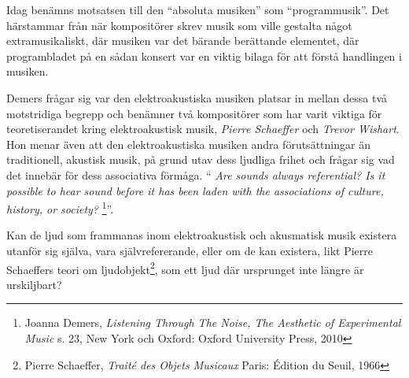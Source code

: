 \documentclass{article}
\begin{document}
Idag benämns motsatsen till den ``absoluta musiken'' som ``programmusik''. Det härstammar från när
kompositörer skrev musik som ville gestalta något extramusikaliskt, där musiken var det bärande berättande
elementet, där programbladet på en sådan konsert var en viktig bilaga
för att förstå handlingen i musiken. 

Demers frågar sig var den elektroakustiska musiken platsar in mellan dessa två motstridiga begrepp och
benämner två kompositörer som har varit viktiga för teoretiserandet kring elektroakustisk musik, \emph{Pierre
Schaeffer} och \emph{Trevor Wishart}. Hon menar även att den elektroakustiska musiken andra förutsättningar än
traditionell, akustisk musik, på grund utav dess ljudliga frihet och frågar sig
vad det innebär för dess associativa förmåga. ``
\emph{Are sounds always referential? Is it possible to hear sound before it has been laden with the
associations of culture, history, or society?}
\footnote{Joanna Demers, \emph{Listening Through The Noise, The Aesthetic of Experimental Music} s. 23, New
York och Oxford: Oxford University Press, 2010}''.

%

Kan de ljud som frammanas inom elektroakustisk och akusmatisk musik existera utanför sig
själva, vara självrefererande, eller om de kan existera, likt Pierre Schaeffers teori om
ljudobjekt\footnote{Pierre Schaeffer, \emph{Traité des Objets Musicaux} Paris: Édition du Seuil, 1966}, som
ett ljud där ursprunget inte längre är urskiljbart? 
\end{document}
